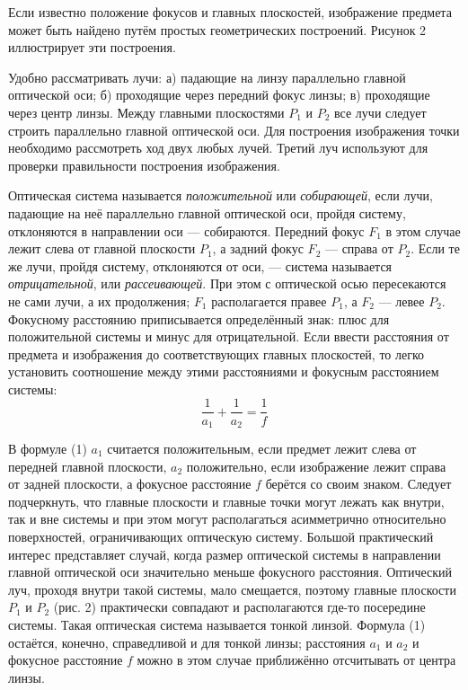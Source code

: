 \documentclass[14pt]{article}
\begin{document}
Если известно положение фокусов
и главных плоскостей, изображение
предмета может быть найдено путём простых геометрических построений.
Рисунок 2 иллюстрирует эти построения.


Удобно рассматривать лучи: а) падающие на линзу параллельно главной
оптической оси; б) проходящие через передний фокус линзы; в) проходящие
через центр линзы. Между главными плоскостями $P_1$ и $P_2$ все
лучи следует строить параллельно главной оптической оси. Для построения
изображения точки необходимо рассмотреть
ход двух любых лучей. Третий луч используют для проверки правильности построения изображения.


Оптическая система называется \textsl{положительной} или \textsl{собирающей},
если лучи, падающие на
неё параллельно главной оптической
оси, пройдя систему, отклоняются в направлении оси
— собираются.
Передний фокус $F_1$ в
этом случае лежит слева от главной
плоскости $P_1$, а задний фокус
$F_2$ — справа от
$P_2$. Если те
же лучи, пройдя систему, отклоняются от оси,
— система называется \textsl{отрицательной}, или \textsl{рассеивающей}. При этом с оптической осью пересекаются не сами лучи,
а их продолжения;
$F_1$ располагается правее $P_1$, а $F_2$ — левее $P_2$. Фокусному расстоянию приписывается определённый
знак: плюс для положительной системы и минус для отрицательной. Если
ввести расстояния от предмета и изображения до соответствующих главных плоскостей, то легко установить соотношение между этими расстояниями
и фокусным расстоянием системы:
\begin{equation}
\frac{1}{a_1} + \frac{1}{a_2} = \frac{1}{f}
\end{equation}

В формуле (1) $a_1$ считается положительным, если предмет лежит слева
от передней главной плоскости, $a_2$ положительно, если изображение
лежит справа от задней плоскости,
а фокусное расстояние
$f$ берётся со
своим знаком.
Следует подчеркнуть, что главные плоскости
и главные точки могут
лежать
как внутри, так
и вне системы
и при этом могут располагаться
асимметрично относительно поверхностей, ограничивающих оптическую
систему.
Большой практический интерес представляет случай,
когда размер
оптической системы в направлении главной оптической оси значительно
меньше фокусного расстояния. Оптический луч, проходя внутри такой
системы, мало смещается, поэтому главные плоскости
$P_1$ и
$P_2$ (рис. 2)
практически совпадают
и располагаются где-то посередине системы.
Такая
оптическая система называется тонкой линзой. Формула (1) остаётся,
конечно, справедливой
и для тонкой линзы; расстояния
$a_1$ и $a_2$ и фокусное расстояние
$f$ можно в этом случае приближённо отсчитывать
от центра линзы.
\end{document}
